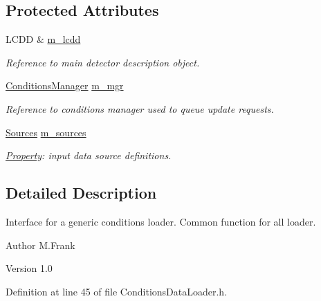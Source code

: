 \subsection*{Protected Attributes}
\begin{DoxyCompactItemize}
\item 
LCDD \& \hyperlink{class_d_d4hep_1_1_conditions_1_1_conditions_data_loader_a6920143ee0788f253031a3d0a25e2d0f}{m\_\-lcdd}
\begin{DoxyCompactList}\small\item\em Reference to main detector description object. \item\end{DoxyCompactList}\item 
\hyperlink{class_d_d4hep_1_1_conditions_1_1_conditions_manager}{ConditionsManager} \hyperlink{class_d_d4hep_1_1_conditions_1_1_conditions_data_loader_a470c95c837745118517cc86bdc668346}{m\_\-mgr}
\begin{DoxyCompactList}\small\item\em Reference to conditions manager used to queue update requests. \item\end{DoxyCompactList}\item 
\hyperlink{class_d_d4hep_1_1_conditions_1_1_conditions_data_loader_a10469a47fdf0b7949194f79c35ee9510}{Sources} \hyperlink{class_d_d4hep_1_1_conditions_1_1_conditions_data_loader_a1f27d2cb0eb76ecfb39322fb08343b31}{m\_\-sources}
\begin{DoxyCompactList}\small\item\em \hyperlink{class_d_d4hep_1_1_property}{Property}: input data source definitions. \item\end{DoxyCompactList}\end{DoxyCompactItemize}


\subsection{Detailed Description}
Interface for a generic conditions loader. Common function for all loader.

\begin{DoxyAuthor}{Author}
M.Frank 
\end{DoxyAuthor}
\begin{DoxyVersion}{Version}
1.0 
\end{DoxyVersion}


Definition at line 45 of file ConditionsDataLoader.h.

